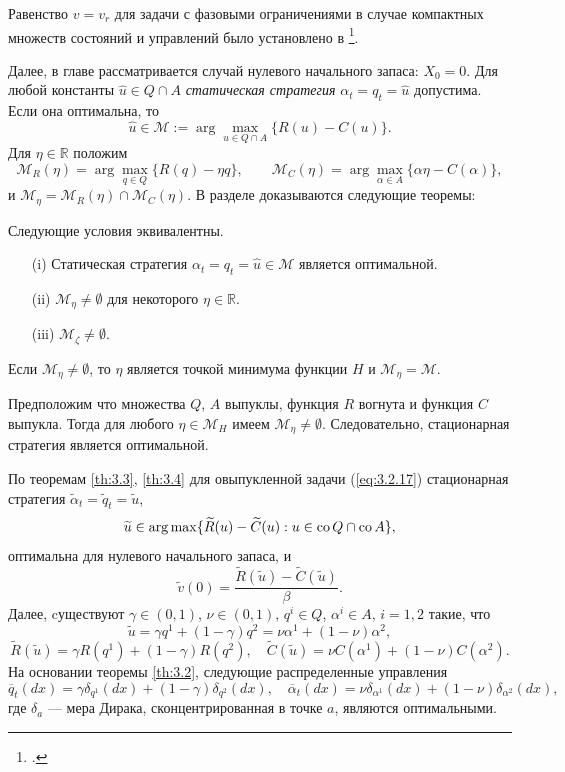 \documentclass[twoside,12pt]{article}
\begin{document}
Равенство $v=v_r$ для задачи с фазовыми ограничениями в случае компактных множеств состояний и управлений было установлено в \footcite{Lor87}.

Далее,  в главе рассматривается случай нулевого начального запаса: $X_0=0$. Для любой константы $\widehat u\in Q\cap A$ \emph{статическая стратегия} $\alpha_t=q_t= \widehat u$ допустима. Если она оптимальна, то
$$ \widehat u\in\mathscr M:=\arg\max_{u\in Q\cap A}\{R(u)-C(u)\}. $$
Для $\eta\in\mathbb R$ положим
$$\mathscr M_R(\eta)=\arg\max_{q\in Q}\{R(q)-\eta q\},\qquad
  \mathscr M_C(\eta)=\arg\max_{\alpha\in A}\{\alpha\eta-C(\alpha)\},$$
и $\mathscr M_\eta=\mathscr M_R(\eta)\cap\mathscr M_C(\eta)$.
В разделе доказываются следующие теоремы:
\begin{theorem} \label{th:3.3}
Следующие условия эквивалентны.
\begin{itemize}
\item[(i)] Статическая стратегия $\alpha_t=q_t= \widehat u\in\mathscr M$ является оптимальной.
\item[(ii)]  $\mathscr M_\eta\neq\emptyset$ для некоторого $\eta\in\mathbb R$.
\item[(iii)]  $\mathscr M_\zeta\neq\emptyset$.
\end{itemize}
Если $\mathscr M_\eta\neq\emptyset$, то $\eta$ является точкой минимума функции $H$ и $\mathscr M_\eta=\mathscr M$.
\end{theorem}
\begin{theorem} \label{th:3.4}
Предположим что множества $Q$, $A$ выпуклы, функция $R$ вогнута и функция $C$ выпукла.
Тогда для любого $\eta\in\mathscr M_H$ имеем
$\mathscr M_\eta\neq\emptyset$.
Следовательно, стационарная стратегия является оптимальной.
\end{theorem}
По теоремам \ref{th:3.3}, \ref{th:3.4} для овыпукленной задачи (\ref{eq:3.2.17}) стационарная стратегия $\widetilde\alpha_t=\widetilde q_t=\widetilde u$,
$$ \widetilde u\in\arg\max\{\widetilde R(u)-\widetilde C(u):u\in{\rm co\,} Q\cap{\rm co\,} A\}, $$
оптимальна для нулевого начального запаса, и
$$\widetilde v(0)=\frac{\widetilde R(\widetilde u)-\widetilde C(\widetilde u)}{\beta}.$$
Далее, cуществуют $\gamma\in (0,1)$, $\nu\in (0,1)$, $q^i\in Q$, $\alpha^i\in A$, $i=1,2$ такие, что
\begin{equation} \label{eq:3.3.9}
\widetilde u=\gamma q^1+(1-\gamma) q^2=\nu\alpha^1+(1-\nu)\alpha^2,
\end{equation}
\begin{equation} \label{eq:3.3.10}
\widetilde R(\widetilde u)=\gamma R(q^1)+(1-\gamma) R(q^2),\quad \widetilde C(\widetilde u)=\nu C(\alpha^1)+(1-\nu) C(\alpha^2).
\end{equation}
На основании теоремы \ref{th:3.2}, следующие распределенные управления
\begin{equation} \label{eq:3.3.11}
 \overline q_t(dx)=\gamma\delta_{q^1}(dx)+(1-\gamma)\delta_{q^2}(dx),\quad
 \overline \alpha_t(dx)=\nu\delta_{\alpha^1}(dx)+(1-\nu)\delta_{\alpha^2}(dx),
\end{equation}
где $\delta_a$ --- мера Дирака, сконцентрированная в точке $a$, являются оптимальными.
\end{document}
